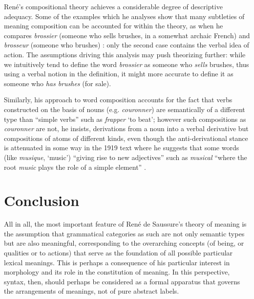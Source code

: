 \documentclass[output=paper]{langsci/langscibook}
\begin{document}
René's compositional theory achieves a considerable degree of
descriptive adequacy. Some of the examples which he analyses show that
many subtleties of meaning composition can be accounted for within the
theory, as when he compares \emph{brossier} (someone who sells
brushes, in a somewhat archaic French) and \emph{brosseur} (someone
who brushes) \citep[112]{r.desaussure11:formation}: only the second
case contains the verbal idea of action. The assumptions driving this
analysis may push theorizing further: while we intuitively tend to
define the word \emph{brossier} as someone who \emph{sells} brushes,
thus using a verbal notion in the definition, it might more accurate
to define it as someone who \emph{has brushes} (for sale).

Similarly, his approach to word composition accounts for the fact that
verbs constructed on the basis of nouns (e.g. \emph{couronner}) are
semantically of a different type than ``simple verbs'' such as
\emph{frapper} ‘to beat’; however such compositions as
\emph{couronner} are not, he insists, derivations from a noun into a
verbal derivative but compositions of atoms of different kinds, even
though the anti-derivational stance is attenuated in some way in the
1919 text where he suggests that some words (like \emph{musique},
‘music’) “giving rise to new adjectives” such as \emph{musical} “where
the root \emph{music} plays the role of a simple element”
\citep[5]{r.desaussure19:structure.logique}.

\section{Conclusion}
\label{sec:semantics-conclusion}

All in all, the most important feature of René de Saussure’s theory of
meaning is the assumption that grammatical categories as such are not
only semantic types but are also meaningful, corresponding to the
overarching concepts (of being, or qualities or to actions) that serve
as the foundation of all possible particular lexical meanings. This is
perhaps a consequence of his particular interest in morphology and
its role in the constitution of meaning. In this perspective, syntax,
then, should perhaps be considered as a formal apparatus that governs
the arrangements of meanings, not of pure abstract labels.


\sloppy
\printbibliography[heading=subbibliography,notkeyword=this] 
\end{document}
